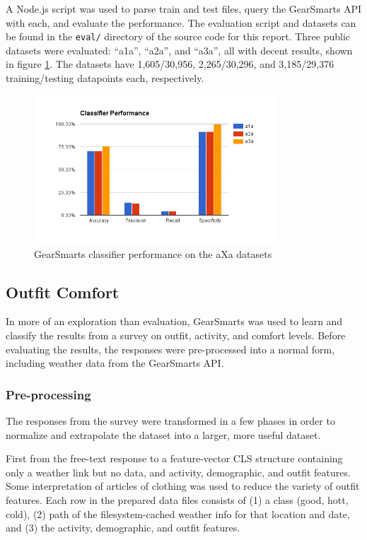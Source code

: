 A Node.js script was used to parse train and test files, query the GearSmarts API with each, and evaluate the performance.
The evaluation script and datasets can be found in the \texttt{eval/} directory of the source code for this report.
Three public datasets were evaluated: ``a1a'', ``a2a'', and ``a3a'', all with decent results, shown in figure \ref{fig:aXa}.
The datasets have 1,605/30,956, 2,265/30,296, and 3,185/29,376 training/testing datapoints each, respectively.

\begin{figure}[ht!]
    \centering
    \includegraphics[width=90mm]{img/aXa.png}
    \caption{GearSmarts classifier performance on the aXa datasets}
    \label{fig:aXa}
\end{figure}

\subsection{Outfit Comfort}
In more of an exploration than evaluation, GearSmarts was used to learn and classify the results from a survey on
outfit, activity, and comfort levels. Before evaluating the results, the responses were pre-processed into a normal
form, including weather data from the GearSmarts API.

\subsubsection{Pre-processing}
\label{subsection:preprocessing}
The responses from the survey were transformed in a few phases in order to normalize and extrapolate the dataset into a
larger, more useful dataset.

First from the free-text response to a feature-vector CLS structure
containing only a weather link but no data, and activity, demographic, and outfit features. Some interpretation of articles of clothing
was used to reduce the variety of outfit features. Each row in the prepared data
files consists of (1) a class (good, hott, cold), (2) path of the filesystem-cached weather info for that location and
date, and (3) the activity, demographic, and outfit features.

